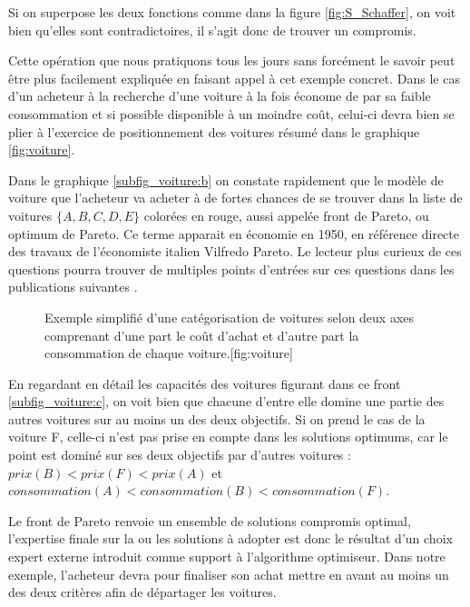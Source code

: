 Si on superpose les deux fonctions comme dans la figure \ref{fig:S_Schaffer}, on voit bien qu'elles sont contradictoires, il s'agit donc de trouver un compromis.

Cette opération que nous pratiquons tous les jours sans forcément le savoir peut être plus facilement expliquée en faisant appel à cet exemple concret. Dans le cas d'un acheteur à la recherche d'une voiture à la fois économe de par sa faible consommation et si possible disponible à un moindre coût, celui-ci devra bien se plier à l'exercice de positionnement des voitures résumé dans le graphique \ref{fig:voiture}.

Dans le graphique \ref{subfig_voiture:b} on constate rapidement que le modèle de voiture que l'acheteur va acheter à de fortes chances de se trouver dans la liste de voitures $\{ A,B,C,D,E \}$ colorées en rouge, aussi appelée front de Pareto, ou optimum de Pareto. Ce terme apparait en économie en 1950, en référence directe des travaux de l'économiste italien Vilfredo Pareto. Le lecteur plus curieux de ces questions pourra trouver de multiples points d'entrées sur ces questions dans les publications suivantes \autocites{Ehrgott2012,Koksalan2011,Koksalan2013}.

\begin{figure}[!htbp]
	\begin{sidecaption}[fortoc]{Exemple simplifié d'une catégorisation de voitures selon deux axes comprenant d'une part le coût d'achat et d'autre part la consommation de chaque voiture.}[fig:voiture]
	\centering
	  \qquad
 \end{sidecaption}
\end{figure}

\sloppy En regardant en détail les capacités des voitures figurant dans ce front \ref{subfig_voiture:c}, on voit bien que chacune d'entre elle domine une partie des autres voitures sur au moins un des deux objectifs. Si on prend le cas de la voiture F, celle-ci n'est pas prise en compte dans les solutions optimums, car le point est dominé sur ses deux objectifs par d'autres voitures : $ prix(B) < prix(F) < prix(A) $ et $consommation(A) < consommation (B) < consommation(F)$.

Le front de Pareto renvoie un ensemble de solutions compromis optimal, l'expertise finale sur la ou les solutions à adopter est donc le résultat d'un choix expert externe introduit comme support à l'algorithme optimiseur. Dans notre exemple, l'acheteur devra pour finaliser son achat mettre en avant au moins un des deux critères afin de départager les voitures.

